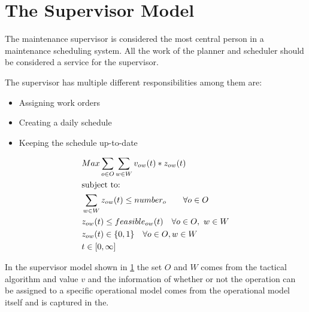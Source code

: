 \section{The Supervisor Model}
The maintenance supervisor is considered the most central person in a maintenance scheduling system. 
All the work of the planner and scheduler should be considered a service for the supervisor.

The supervisor has multiple different responsibilities among them are: 

\begin{itemize}
	\item Assigning work orders
	\item Creating a daily schedule
	\item Keeping the schedule up-to-date
\end{itemize}


\begin{alignat}{2}
	& Max \sum_{o \in O} \sum_{w \in W} v_{ow}(t) * z_{ow}(t) \\ 
	&\text{subject to:} \notag \\ 
	&\sum_{w \in W} z_{ow}(t) \leq number_o \quad \quad \forall o \in O  \\
	& z_{ow}(t) \leq feasible_{ow}(t) \quad \forall o \in O, \ w \in W \\
	& z_{ow}(t) \in \{0, 1\} \quad \forall o \in O, w \in W \\ 
    & t \in  [0, \infty] 
\end{alignat}

In the supervisor model shown in \ref{} the set $O$ and $W$ comes from the tactical algorithm
and value $v$ and the information of whether or not the operation can be assigned to a 
specific operational model comes from the operational model itself and is captured in the.

